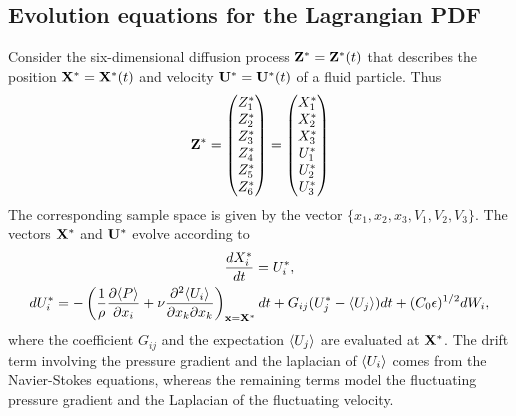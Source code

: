 \documentclass[oneside,a4paper,11pt]{report}
\begin{document}
\subsection{Evolution equations for the Lagrangian PDF}

Consider the six-dimensional diffusion process $\mathbf{Z}^* = \mathbf{Z}^*(t)$  that describes the position $\mathbf{X}^* = \mathbf{X}^*(t)$ and velocity $\mathbf{U}^* = \mathbf{U}^*(t)$ of a fluid particle. Thus
\begin{equation}
\bold{Z}^* = \begin{pmatrix}
  Z_1^* \\
  Z_2^* \\
  Z_3^* \\
  Z_4^* \\
  Z_5^* \\
  Z_6^*
 \end{pmatrix}
=\begin{pmatrix}
  X_1^* \\
  X_2^* \\
  X_3^* \\
  U_1^* \\
  U_2^* \\
  U_3^*
 \end{pmatrix}
\end{equation}
The corresponding sample space is given by the vector $\{x_1, x_2, x_3, V_1, V_2, V_3\}$. The vectors $\mathbf{X}^*$ and $\mathbf{U}^*$ evolve according to
\begin{gather}
\frac{d X^*_i}{dt} = U^*_i, \\
dU_i^* = -\left ( \frac{1}{\rho} \frac{\partial \langle P \rangle}{\partial x_i} + \nu \frac{\partial^2 \langle U_i \rangle}{\partial x_k \partial x_k} \right )_{\mathbf{x} = \mathbf{X}^*} dt + G_{ij} (U_j^* - \langle U_j \rangle) dt + (C_0 \epsilon)^{1/2} dW_i,
\end{gather} 
where the coefficient $G_{ij}$ and the expectation $\langle U_j \rangle$ are evaluated at $\mathbf{X}^*$. The drift term involving the pressure gradient and the laplacian of $\langle U_i \rangle$ comes from the Navier-Stokes equations, whereas the remaining terms model the fluctuating pressure gradient and the Laplacian of the fluctuating velocity.
\end{document}

